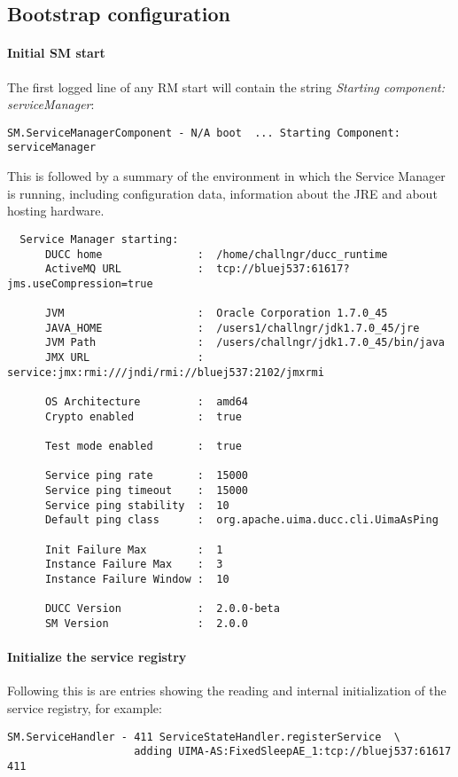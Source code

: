 \subsection{Bootstrap configuration}

    \paragraph{Initial SM start}
    The first logged line of any RM start will contain the string {\em Starting component:  serviceManager}:
\begin{verbatim}
SM.ServiceManagerComponent - N/A boot  ... Starting Component:  serviceManager
\end{verbatim}

    This is followed by a summary of the environment in which the Service Manager is running, including
    configuration data, information about the JRE and about hosting hardware.

\begin{verbatim}
  Service Manager starting:
      DUCC home               :  /home/challngr/ducc_runtime
      ActiveMQ URL            :  tcp://bluej537:61617?jms.useCompression=true
  
      JVM                     :  Oracle Corporation 1.7.0_45
      JAVA_HOME               :  /users1/challngr/jdk1.7.0_45/jre
      JVM Path                :  /users/challngr/jdk1.7.0_45/bin/java
      JMX URL                 :  service:jmx:rmi:///jndi/rmi://bluej537:2102/jmxrmi
  
      OS Architecture         :  amd64
      Crypto enabled          :  true
  
      Test mode enabled       :  true
  
      Service ping rate       :  15000
      Service ping timeout    :  15000
      Service ping stability  :  10
      Default ping class      :  org.apache.uima.ducc.cli.UimaAsPing
  
      Init Failure Max        :  1
      Instance Failure Max    :  3
      Instance Failure Window :  10
  
      DUCC Version            :  2.0.0-beta
      SM Version              :  2.0.0
\end{verbatim}

    \paragraph{Initialize the service registry}
    Following this is are entries showing the reading and internal initialization of the
    service registry, for example:
\begin{verbatim}
SM.ServiceHandler - 411 ServiceStateHandler.registerService  \
                    adding UIMA-AS:FixedSleepAE_1:tcp://bluej537:61617 411
\end{verbatim}

